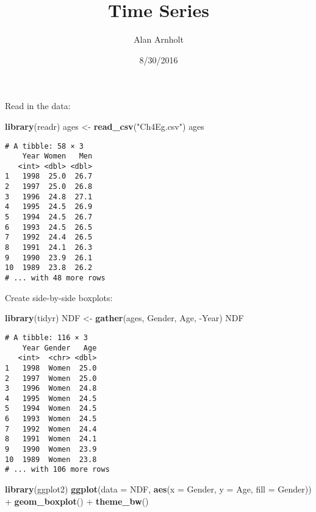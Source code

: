 \documentclass[]{article}
\title{Time Series}
\author{Alan Arnholt}
\date{8/30/2016}
\newenvironment{Shaded}{\begin{snugshade}}{\end{snugshade}}
\newcommand{\KeywordTok}[1]{\textcolor[rgb]{0.13,0.29,0.53}{\textbf{{#1}}}}
\newcommand{\DataTypeTok}[1]{\textcolor[rgb]{0.13,0.29,0.53}{{#1}}}
\newcommand{\StringTok}[1]{\textcolor[rgb]{0.31,0.60,0.02}{{#1}}}
\newcommand{\NormalTok}[1]{{#1}}
\begin{document}
\maketitle

Read in the data:

\begin{Shaded}
\begin{Highlighting}[]
\KeywordTok{library}\NormalTok{(readr)}
\NormalTok{ages <-}\StringTok{ }\KeywordTok{read_csv}\NormalTok{(}\StringTok{"Ch4Eg.csv"}\NormalTok{)}
\NormalTok{ages}
\end{Highlighting}
\end{Shaded}

\begin{verbatim}
# A tibble: 58 × 3
    Year Women   Men
   <int> <dbl> <dbl>
1   1998  25.0  26.7
2   1997  25.0  26.8
3   1996  24.8  27.1
4   1995  24.5  26.9
5   1994  24.5  26.7
6   1993  24.5  26.5
7   1992  24.4  26.5
8   1991  24.1  26.3
9   1990  23.9  26.1
10  1989  23.8  26.2
# ... with 48 more rows
\end{verbatim}

Create side-by-side boxplots:

\begin{Shaded}
\begin{Highlighting}[]
\KeywordTok{library}\NormalTok{(tidyr)}
\NormalTok{NDF <-}\StringTok{ }\KeywordTok{gather}\NormalTok{(ages, Gender, Age, -Year)}
\NormalTok{NDF}
\end{Highlighting}
\end{Shaded}

\begin{verbatim}
# A tibble: 116 × 3
    Year Gender   Age
   <int>  <chr> <dbl>
1   1998  Women  25.0
2   1997  Women  25.0
3   1996  Women  24.8
4   1995  Women  24.5
5   1994  Women  24.5
6   1993  Women  24.5
7   1992  Women  24.4
8   1991  Women  24.1
9   1990  Women  23.9
10  1989  Women  23.8
# ... with 106 more rows
\end{verbatim}

\begin{Shaded}
\begin{Highlighting}[]
\KeywordTok{library}\NormalTok{(ggplot2)}
\KeywordTok{ggplot}\NormalTok{(}\DataTypeTok{data =} \NormalTok{NDF, }\KeywordTok{aes}\NormalTok{(}\DataTypeTok{x =} \NormalTok{Gender, }\DataTypeTok{y =} \NormalTok{Age, }\DataTypeTok{fill =} \NormalTok{Gender)) +}\StringTok{ }\KeywordTok{geom_boxplot}\NormalTok{() +}\StringTok{ }
\StringTok{  }\KeywordTok{theme_bw}\NormalTok{()}
\end{Highlighting}
\end{Shaded}
\end{document}
